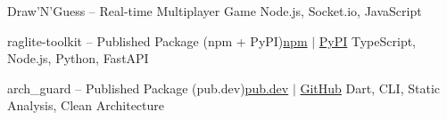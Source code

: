 \documentclass[a4paper,10pt]{article}
\begin{document}
    \resumeSubheading
      {Draw'N'Guess -- Real-time Multiplayer Game}{}
      {Node.js, Socket.io, JavaScript}{}
      \resumeItemListStart
      \resumeItemListEnd

    \resumeSubheading
      {raglite-toolkit -- Published Package (npm + PyPI)}{\href{https://www.npmjs.com/package/raglite-toolkit}{npm} $|$ \href{https://pypi.org/project/raglite-toolkit/}{PyPI}}
      {TypeScript, Node.js, Python, FastAPI}{}
      \resumeItemListStart
      \resumeItemListEnd

    \resumeSubheading
      {arch\_guard -- Published Package (pub.dev)}{\href{https://pub.dev/packages/arch_guard}{pub.dev} $|$ \href{https://github.com/creatorpiyush/arch_guard}{GitHub}}
      {Dart, CLI, Static Analysis, Clean Architecture}{}
      \resumeItemListStart
      \resumeItemListEnd

  \resumeSubHeadingListEnd


\end{document}
